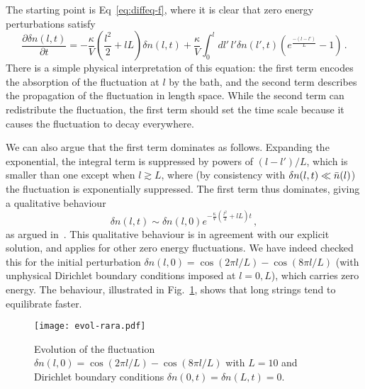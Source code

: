 \documentclass[a4paper,11pt]{article}
\newcommand{\lr}[1]{\left(#1\right)}
\begin{document}
The starting point is Eq~\eqref{eq:diffeq-f}, where it is clear that zero energy perturbations satisfy
\begin{equation}\label{eq:zero-spreading}
    \frac{\partial{ \delta n(l,t)}}{\partial t}=-\frac{\kappa}{V}\lr{\frac{l^2}{2}+lL}\delta n(l,t)+\frac{\kappa}{V}\int_0^l{dl'\, l'\delta n(l',t)\lr{e^{\frac{-(l-l')}{L}}-1}}\, .
\end{equation}
There is a simple physical interpretation of this equation: the first term encodes the absorption of the fluctuation at $l$ by the bath, and the second term describes the propagation of the fluctuation in length space. While the second
term can redistribute the fluctuation, the first term should set the time
scale because it causes the fluctuation to decay everywhere.

We can also argue that the first term dominates as follows.
Expanding the exponential, the integral term is suppressed by powers of $(l-l')/L$, which is smaller than one except when $l\gtrsim L$, where (by consistency with $\delta n(l,t)\ll \Bar{n}(l)$) the fluctuation is exponentially suppressed.
The first term thus dominates, giving a qualitative behaviour
\begin{equation}
    \delta n(l,t)\sim \delta n (l,0)e^{-\frac{\kappa}{V}\lr{\frac{l^2}{2}+l L}t}\, ,
\end{equation}
as argued in~\cite{Lowe:1994nm}.
This qualitative behaviour is in agreement with our explicit solution, and applies for other zero energy fluctuations. 
We have indeed checked this for the initial perturbation $\delta n(l,0)=\cos\lr{2\pi l/L}-\cos \lr{8 \pi l/L}$ (with unphysical Dirichlet boundary 
conditions imposed at $l=0,L$), which carries zero energy.
The behaviour, illustrated in Fig.~\ref{fig:fluctuation}, shows that long strings tend to equilibrate faster.

\begin{figure} 
  \centering  \texttt{[image: evol-rara.pdf]}
\caption{Evolution of the fluctuation $\delta n(l,0)=\cos\lr{2\pi l/L}-\cos \lr{8 \pi l/L}$ with $L=10$ and Dirichlet boundary conditions $\delta n (0,t)=\delta n(L,t)=0$.}
\label{fig:fluctuation}
\end{figure}
\end{document}
